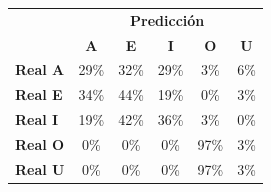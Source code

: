 \begin{tabular}{lccccc}
\toprule
 & \multicolumn{5}{c}{\textbf{Predicción}} \\
 & \textbf{A} & \textbf{E} & \textbf{I} & \textbf{O} & \textbf{U} \\
\midrule
\textbf{Real A} & \cellcolor[rgb]{0.79,0.79,1.00}  29\% & \cellcolor[rgb]{0.77,0.77,1.00}  32\% & \cellcolor[rgb]{0.79,0.79,1.00}  29\% & \cellcolor[rgb]{0.98,0.98,1.00}  3\% & \cellcolor[rgb]{0.96,0.96,1.00}  6\% \\
\textbf{Real E} & \cellcolor[rgb]{0.76,0.76,1.00}  34\% & \cellcolor[rgb]{0.69,0.69,1.00}  44\% & \cellcolor[rgb]{0.87,0.87,1.00}  19\% & \cellcolor[rgb]{1.00,1.00,1.00}  0\% & \cellcolor[rgb]{0.98,0.98,1.00}  3\% \\
\textbf{Real I} & \cellcolor[rgb]{0.86,0.86,1.00}  19\% & \cellcolor[rgb]{0.71,0.71,1.00}  42\% & \cellcolor[rgb]{0.75,0.75,1.00}  36\% & \cellcolor[rgb]{0.98,0.98,1.00}  3\% & \cellcolor[rgb]{1.00,1.00,1.00}  0\% \\
\textbf{Real O} & \cellcolor[rgb]{1.00,1.00,1.00}  0\% & \cellcolor[rgb]{1.00,1.00,1.00}  0\% & \cellcolor[rgb]{1.00,1.00,1.00}  0\% & \cellcolor[rgb]{0.32,0.32,1.00} \color{white} 97\% & \cellcolor[rgb]{0.98,0.98,1.00}  3\% \\
\textbf{Real U} & \cellcolor[rgb]{1.00,1.00,1.00}  0\% & \cellcolor[rgb]{1.00,1.00,1.00}  0\% & \cellcolor[rgb]{1.00,1.00,1.00}  0\% & \cellcolor[rgb]{0.32,0.32,1.00} \color{white} 97\% & \cellcolor[rgb]{0.98,0.98,1.00}  3\% \\
\bottomrule
\end{tabular}